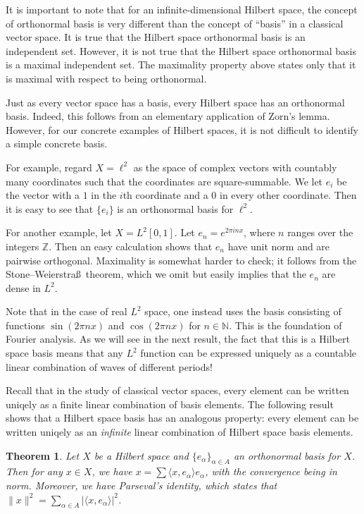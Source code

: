 \documentclass[11pt,oneside]{amsbook}
\newcommand{\NN}{{\mathbb N}}
\newcommand{\ZZ}{{\mathbb Z}}
\theoremstyle{definition}
\theoremstyle{plain}
\newtheorem{thm}{Theorem}[section]
\theoremstyle{definition}
\theoremstyle{remark}
\numberwithin{equation}{section}
\numberwithin{figure}{section}
\begin{document}
It is important to note that for an infinite-dimensional Hilbert space, the concept of orthonormal basis is very different than the concept of ``basis'' in a classical vector space. It is true that the Hilbert space orthonormal basis is an independent set. However, it is not true that the Hilbert space orthonormal basis is a maximal independent set. The maximality property above states only that it is maximal with respect to being orthonormal.

Just as every vector space has a basis, every Hilbert space has an orthonormal basis. Indeed, this follows from an elementary application of Zorn's lemma. However, for our concrete examples of Hilbert spaces, it is not difficult to identify a simple concrete basis.

For example, regard $X=\ell^2$ as the space of complex vectors with countably many coordinates such that the coordinates are square-summable. We let $e_i$ be the vector with a $1$ in the $i$th coordinate and a $0$ in every other coordinate. Then it is easy to see that $\{e_i\}$ is an orthonormal basis for $\ell^2$.

For another example, let $X=L^2[0,1]$. Let $e_n=e^{2\pi i nx}$, where $n$ ranges over the integers $\ZZ$. Then an easy calculation shows that $e_n$ have unit norm and are pairwise orthogonal. Maximality is somewhat harder to check; it follows from the Stone--Weierstra\ss\ theorem, which we omit but easily implies that the $e_n$ are dense in $L^2$.

Note that in the case of real $L^2$ space, one instead uses the basis consisting of functions $\sin(2\pi nx)$ and $\cos(2\pi nx)$ for $n\in\NN$. This is the foundation of Fourier analysis. As we will see in the next result, the fact that this is a Hilbert space basis means that any $L^2$ function can be expressed uniquely as a countable linear combination of waves of different periods!

Recall that in the study of classical vector spaces, every element can be written uniqely as a finite linear combination of basis elements. The following result shows that a Hilbert space basis has an analogous property: every element can be written uniqely as an \emph{infinite} linear combination of Hilbert space basis elements.

\begin{thm}
  Let $X$ be a Hilbert space and $\{e_\alpha\}_{\alpha\in A}$ an orthonormal basis for $X$. Then for any $x\in X$, we have $x=\sum\langle x,e_\alpha\rangle e_\alpha$, with the convergence being in norm. Moreover, we have Parseval's identity, which states that $\|x\|^2=\sum_{\alpha\in A}|\langle x,e_\alpha\rangle|^2$.
\end{thm}
\end{document}

